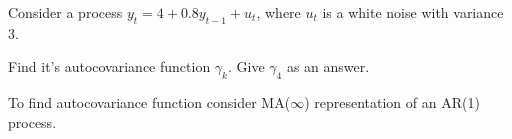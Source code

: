
\begin{question}
Consider a process \(y_t = 4 + 0.8 y_{t-1} + u_t\), where \(u_t\) is a white noise with variance 3.

Find it's autocovariance function \(\gamma_k\). Give \(\gamma_4\) as an answer.
\end{question}

\begin{solution}
To find autocovariance function consider MA(\(\infty\)) representation of an AR(1) process.
\end{solution}


